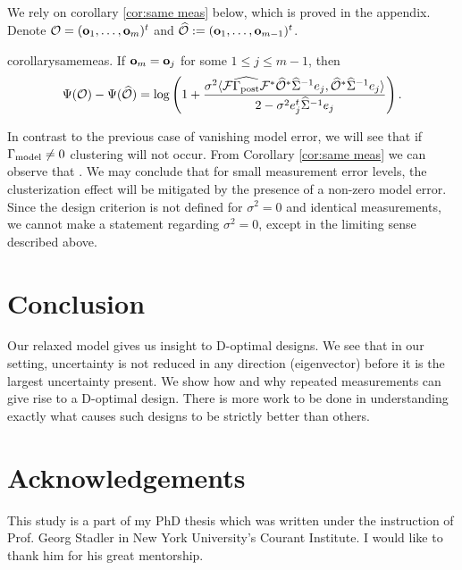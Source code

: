 \documentclass{amsart}
\numberwithin{equation}{section}
\begin{document}
\subsection{}
We rely on corollary \ref{cor:same meas} below, which is proved in the
appendix. Denote $\mathcal{O} = (\mathbf{o}_1,\dots,\mathbf{o}_m)^t$ and $\widehat{\mathcal{O}} :=
(\mathbf{o}_1,\dots,\mathbf{o}_{m-1})^t$.
\begin{restatable*}{corollary}{samemeas}\label{cor:same meas}.
  If $\mathbf{o}_m = \mathbf{o}_j$ for some $1 \leq j \leq m-1$, then
  \begin{equation*}
    \Psi(\mathcal{O}) - \Psi(\widehat{\mathcal{O}}) =
    \log \left ( 1 + \frac{\sigma^2
      \langle \mathcal{F} \widehat{\Gamma_{\textup{post}}} \mathcal{F}^* \widehat{\mathcal{O}}^* \widehat{\Sigma}^{-1} e_j,
      \widehat{\mathcal{O}}^* \widehat{\Sigma}^{-1}e_j \rangle
    }{
      2 - \sigma^2 e_j^t\widehat{\Sigma}^{-1}e_j 
    }       
    \right ).
  \end{equation*}
\end{restatable*}
 In
contrast to the previous case of vanishing model error, we will see
that if $\Gamma_{\textup{model}} \neq 0$ clustering will not occur. From Corollary
\ref{cor:same meas} we can observe that
. We may conclude that for small measurement error levels, the
clusterization effect will be mitigated by the presence of a non-zero
model error. Since the design criterion is not defined for $\sigma^2 =
0$ and identical measurements, we cannot make a statement regarding
$\sigma^2 = 0$, except in the limiting sense described above.

\section{Conclusion}\label{section:conclusion}
Our relaxed model gives us insight to D-optimal designs. We see that
in our setting, uncertainty is not reduced in any direction
(eigenvector) before it is the largest uncertainty present. We show
how and why repeated measurements can give rise to a D-optimal
design. There is more work to be done in understanding exactly what
causes such designs to be strictly better than others.


\section{Acknowledgements}
This study is a part of my PhD thesis \cite{mine} which was written
under the instruction of Prof. Georg Stadler in New York University's
Courant Institute. I would like to thank him for his great mentorship.
\end{document}
